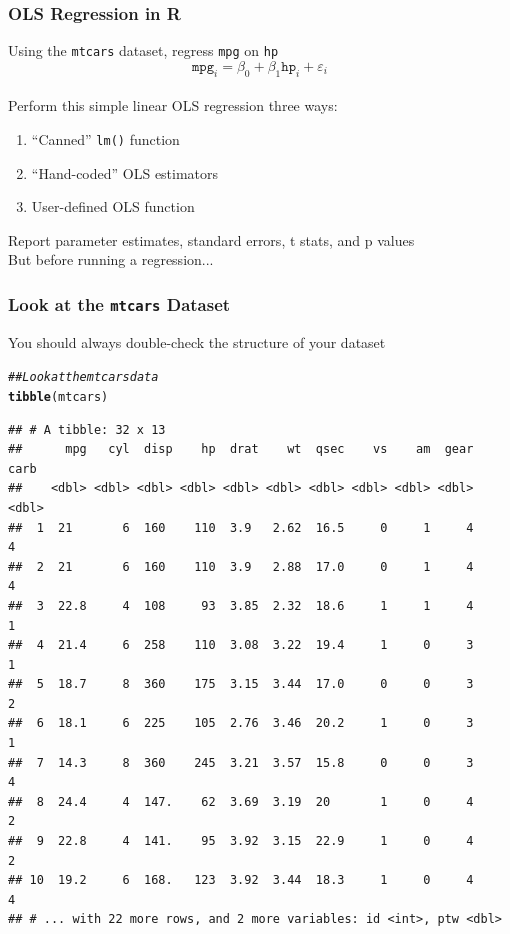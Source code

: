 \documentclass{beamer}\usepackage[]{graphicx}\usepackage[]{color}
\makeatletter
\newcommand{\hlcom}[1]{\textcolor[rgb]{0.678,0.584,0.686}{\textit{#1}}}%
\newcommand{\hlstd}[1]{\textcolor[rgb]{0.345,0.345,0.345}{#1}}%
\newcommand{\hlkwd}[1]{\textcolor[rgb]{0.737,0.353,0.396}{\textbf{#1}}}%
\newenvironment{kframe}{%
 \def\at@end@of@kframe{}%
 \ifinner\ifhmode%
  \def\at@end@of@kframe{\end{minipage}}%
  \begin{minipage}{\columnwidth}%
 \fi\fi%
 \def\FrameCommand##1{\hskip\@totalleftmargin \hskip-\fboxsep
 \colorbox{shadecolor}{##1}\hskip-\fboxsep
     \hskip-\linewidth \hskip-\@totalleftmargin \hskip\columnwidth}%
 \MakeFramed {\advance\hsize-\width
   \@totalleftmargin\z@ \linewidth\hsize
   \@setminipage}}%
 {\par\unskip\endMakeFramed%
 \at@end@of@kframe}
\newenvironment{knitrout}{}{} %
\makeatother
\begin{document}
\begin{frame}\frametitle{OLS Regression in R}
    Using the \texttt{mtcars} dataset, regress \texttt{mpg} on \texttt{hp}
    $$\texttt{mpg}_i = \beta_0 + \beta_1 \texttt{hp}_i + \varepsilon_i$$ \\
    \vspace{2ex}
    Perform this simple linear OLS regression three ways:
    \begin{enumerate}
        \item ``Canned'' \texttt{lm()} function
        \item ``Hand-coded'' OLS estimators
        \item User-defined OLS function 
    \end{enumerate}
    \vspace{2ex}
    Report parameter estimates, standard errors, t stats, and p values \\
    \vspace{2ex}
    But before running a regression...
\end{frame}

\begin{frame}[fragile]\frametitle{Look at the \texttt{mtcars} Dataset}
    You should always double-check the structure of your dataset
\begin{knitrout}\footnotesize
{}\color{fgcolor}\begin{kframe}
\begin{alltt}
\hlcom{## Look at the mtcars data}
\hlkwd{tibble}\hlstd{(mtcars)}
\end{alltt}
\begin{verbatim}
## # A tibble: 32 x 13
##      mpg   cyl  disp    hp  drat    wt  qsec    vs    am  gear  carb
##    <dbl> <dbl> <dbl> <dbl> <dbl> <dbl> <dbl> <dbl> <dbl> <dbl> <dbl>
##  1  21       6  160    110  3.9   2.62  16.5     0     1     4     4
##  2  21       6  160    110  3.9   2.88  17.0     0     1     4     4
##  3  22.8     4  108     93  3.85  2.32  18.6     1     1     4     1
##  4  21.4     6  258    110  3.08  3.22  19.4     1     0     3     1
##  5  18.7     8  360    175  3.15  3.44  17.0     0     0     3     2
##  6  18.1     6  225    105  2.76  3.46  20.2     1     0     3     1
##  7  14.3     8  360    245  3.21  3.57  15.8     0     0     3     4
##  8  24.4     4  147.    62  3.69  3.19  20       1     0     4     2
##  9  22.8     4  141.    95  3.92  3.15  22.9     1     0     4     2
## 10  19.2     6  168.   123  3.92  3.44  18.3     1     0     4     4
## # ... with 22 more rows, and 2 more variables: id <int>, ptw <dbl>
\end{verbatim}
\end{kframe}
\end{knitrout}
\end{frame}
\end{document}
